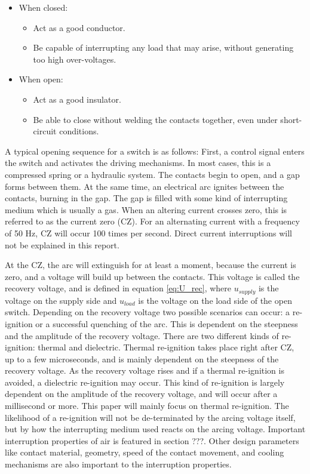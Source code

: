 \documentclass[10pt,a4paper,twoside]{article}
\begin{document}
\begin{itemize}
\item When closed:
	\begin{itemize}
		\item Act as a good conductor.
		\item Be capable of interrupting any load that may arise, without generating too high over-voltages. 
	\end{itemize}
\item When open:
	\begin{itemize}
		\item Act as a good insulator.
		\item Be able to close without welding the contacts together, even under short-circuit conditions.
	\end{itemize}
\end{itemize}

A typical opening sequence for a switch is as follows: First, a control signal enters the switch and activates the driving mechanisms. In most cases, this is a compressed spring or a hydraulic system. The contacts begin to open, and a gap forms between them. At the same time, an electrical arc ignites between the contacts, burning in the gap. The gap is filled with some kind of interrupting medium which is usually a gas. When an altering current crosses zero, this is referred to as the current zero (CZ). For an alternating current with a frequency of 50 Hz, CZ will occur 100 times per second. Direct current interruptions will not be explained in this report.


At the CZ, the arc will extinguish for at least a moment, because the current is zero, and a voltage will build up between the contacts. This voltage is called the recovery voltage, and is defined in equation \eqref{eq:U_rec}, where $u_{supply}$ is the voltage on the supply side and $u_{load}$ is the voltage on the load side of the open switch. Depending on the recovery voltage two possible scenarios can occur: a re-ignition or a successful quenching of the arc. This is dependent on the steepness and the amplitude of the recovery voltage. There are two different kinds of re-ignition: thermal and dielectric. Thermal re-ignition takes place right after CZ, up to a few microseconds, and is mainly dependent on the steepness of the recovery voltage. As the recovery voltage rises and if a thermal re-ignition is avoided, a dielectric re-ignition may occur. This kind of re-ignition is largely dependent on the amplitude of the recovery voltage, and will occur after a millisecond or more. This paper will mainly focus on thermal re-ignition. The likelihood of a re-ignition  will not be de-terminated by the arcing voltage itself, but by how the interrupting medium used reacts on the arcing voltage. Important interruption properties of air is featured in section ???. Other design parameters like contact material, geometry, speed of the contact movement, and cooling mechanisms are also important to the interruption properties.
\end{document}

